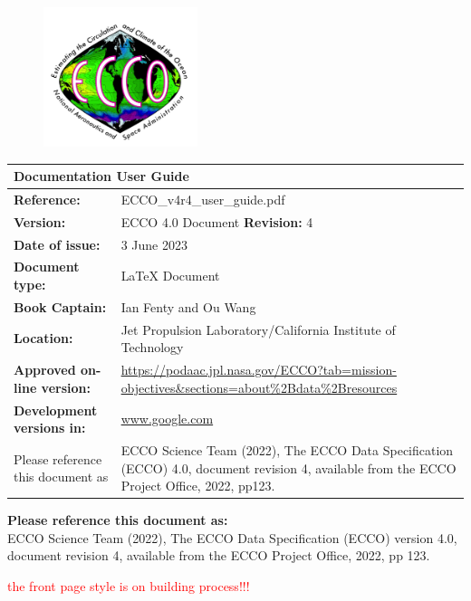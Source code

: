 \begin{figure}[t] %
  \centering %
  \includegraphics[width=0.4\textwidth]{../images/ecco_logo_800_726.png} %
\end{figure}

\maketitle
  
\begin{center}
  \begin{tabular}{|p{2in}|p{4in}|}
    \hline
      \multicolumn{2}{|l|}{\textbf{Documentation User Guide}} \\
    \hline
      \textbf{Reference:} & ECCO\_v4r4\_user\_guide.pdf \\
    \hline
      \textbf{Version:} & ECCO 4.0 Document \textbf{Revision:} 4 \\
    \hline
      \textbf{Date of issue:} & 3 June 2023 \\
    \hline
      \textbf{Document type:} & \LaTeX{} Document \\
    \hline
      \textbf{Book Captain:} & Ian Fenty and Ou Wang \\
    \hline
      \textbf{Location:} & Jet Propulsion Laboratory/California Institute of Technology \\
    \hline
      \textbf{Approved on-line version:} & \url{https://podaac.jpl.nasa.gov/ECCO?tab=mission-objectives\&sections=about\%2Bdata\%2Bresources} \\
    \hline
      \textbf{Development versions in:} & \url{www.google.com} \\
    \hline
      Please reference this document as & ECCO Science Team (2022), The ECCO Data Specification (ECCO) 4.0, document revision 4, available from the ECCO  Project Office, 2022, pp123. \\
    \hline
  \end{tabular}
\end{center}
  
\textbf{Please reference this document as:}\\
  ECCO Science Team (2022), The ECCO Data Specification (ECCO) version 4.0,\\
  document revision 4, available from the ECCO Project Office, 2022, pp 123.

\begin{center}
\textcolor{red}{\Large{the front page style is on building process!!!}}
\end{center}
\newpage
\mbox{}